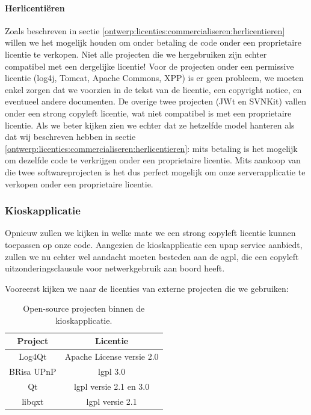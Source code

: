 \paragraph{Herlicentiëren} Zoals beschreven in sectie \ref{ontwerp:licenties:commercialiseren:herlicentieren} willen we het mogelijk houden om onder betaling de code onder een proprietaire licentie te verkopen. Niet alle projecten die we hergebruiken zijn echter compatibel met een dergelijke licentie! Voor de projecten onder een permissive licentie (log4j, Tomcat, Apache Commons, XPP) is er geen probleem, we moeten enkel zorgen dat we voorzien in de tekst van de licentie, een copyright notice, en eventueel andere documenten. De overige twee projecten (JWt en SVNKit) vallen onder een strong copyleft licentie, wat niet compatibel is met een proprietaire licentie. Als we beter kijken zien we echter dat ze hetzelfde model hanteren als dat wij beschreven hebben in sectie \ref{ontwerp:licenties:commercialiseren:herlicentieren}: mits betaling is het mogelijk om dezelfde code te verkrijgen onder een proprietaire licentie. Mits aankoop van die twee softwareprojecten is het dus perfect mogelijk om onze serverapplicatie te verkopen onder een proprietaire licentie.

\subsubsection{Kioskapplicatie}

Opnieuw zullen we kijken in welke mate we een strong copyleft licentie kunnen toepassen op onze code. Aangezien de kioskapplicatie een \ac{upnp} service aanbiedt, zullen we nu echter wel aandacht moeten besteden aan de \ac{agpl}, die een copyleft uitzonderingsclausule voor netwerkgebruik aan boord heeft.

Vooreerst kijken we naar de licenties van externe projecten die we gebruiken:
\begin{table}[h!]
  \begin{center}
    \begin{tabular}{c c}
    Project & Licentie \\
    \hline
    Log4Qt & Apache License versie 2.0 \\
    BRisa UPnP & \ac{lgpl} 3.0 \\
    Qt & \ac{lgpl} versie 2.1 en 3.0 \\
    libqxt & \ac{lgpl} versie 2.1 \\
    \end{tabular}
  \end{center}
  \caption{Open-source projecten binnen de kioskapplicatie.}
\end{table}

